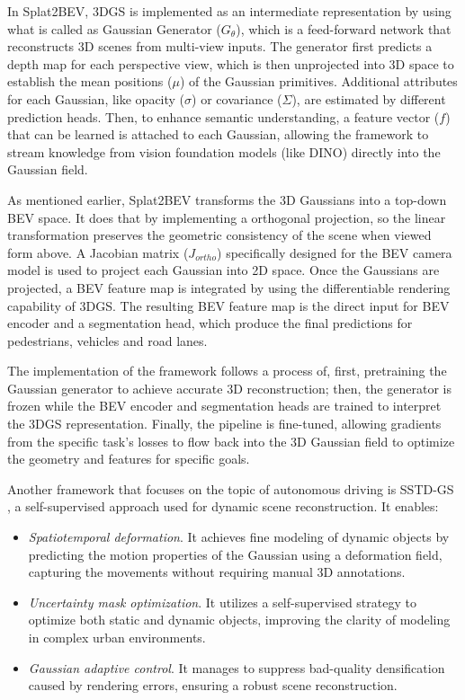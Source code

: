 \documentclass[
	a4paper, %
	10pt, %
	unnumberedsections, %
	twoside, %
]{LTJournalArticle}
\begin{document}
In Splat2BEV, 3DGS is implemented as an intermediate representation by using what is called as Gaussian Generator ($G_\theta$), which is a feed-forward network that reconstructs 3D scenes from multi-view inputs. The generator first predicts a depth map for each perspective view, which is then unprojected into 3D space to establish the mean positions ($\mu$) of the Gaussian primitives. Additional attributes for each Gaussian, like opacity ($\sigma$) or covariance ($\Sigma$), are estimated by different prediction heads. Then, to enhance semantic understanding, a feature vector ($f$) that can be learned is attached to each Gaussian, allowing the framework to stream knowledge from vision foundation models (like DINO) directly into the Gaussian field. 

As mentioned earlier, Splat2BEV transforms the 3D Gaussians into a top-down BEV space. It does that by implementing a orthogonal projection, so the linear transformation preserves the geometric consistency of the scene when viewed form above. A Jacobian matrix ($J_{ortho}$) specifically designed for the BEV camera model is used to project each Gaussian into 2D space. Once the Gaussians are projected, a BEV feature map is integrated by using the differentiable rendering capability of 3DGS. The resulting BEV feature map is the direct input for BEV encoder and a segmentation head, which produce the final predictions for pedestrians, vehicles and road lanes.

The implementation of the framework follows a process of, first, pretraining the Gaussian generator to achieve accurate 3D reconstruction; then, the generator is frozen while the BEV encoder and segmentation heads are trained to interpret the 3DGS representation. Finally, the pipeline is fine-tuned, allowing gradients from the specific task's losses to flow back into the 3D Gaussian field to optimize the geometry and features for specific goals. 

Another framework that focuses on the topic of autonomous driving is SSTD-GS \cite{sstdgs}, a self-supervised approach used for dynamic scene reconstruction. It enables:
\begin{itemize}
	\item \textit{Spatiotemporal deformation}. It achieves fine modeling of dynamic objects by predicting the motion properties of the Gaussian using a deformation field, capturing the movements without requiring manual 3D annotations.
	\item \textit{Uncertainty mask optimization}. It utilizes a self-supervised strategy to optimize both static and dynamic objects, improving the clarity of modeling in complex urban environments.
	\item \textit{Gaussian adaptive control}. It manages to suppress bad-quality densification caused by rendering errors, ensuring a robust scene reconstruction.
\end{itemize}
\end{document}
